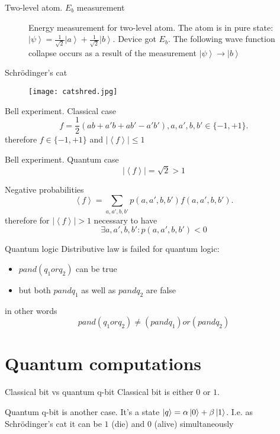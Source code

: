 \documentclass[10pt,pdf,hyperref={unicode}]{beamer}
\begin{document}
\begin{frame}{Two-level atom. $E_b$ measurement}
\begin{figure}
\centering



\caption{Energy measurement for two-level atom. The atom is in pure
  state: $\left|\psi\right> = 
\frac{1}{\sqrt{2}}\left|a\right> + \frac{1}{\sqrt{2}}\left|b\right>$.
Device got $E_b$. The following wave function collapse occurs as a
  result of the measurement $\left|\psi\right> \to \left|b\right>$
}
\label{fig:add:mesure_ex_b}
\end{figure}
\end{frame}

\begin{frame}{Schrödinger's cat}
 \begin{figure} 
   \texttt{[image: catshred.jpg]}
  \end{figure}
\end{frame}

\begin{frame}{Bell experiment. Classical case}
\[
f = \frac{1}{2}\left(
a b + a' b + a b' - a' b'
\right), a,a',b,b' \in \{-1, +1\}.
\]
therefore
\(
f \in \{-1, +1\}
\)
and
\(
\left|\left<f\right>\right| \le 1
\)
\end{frame}

\begin{frame}{Bell experiment. Quantum case}
\[
\left|\left<f\right>\right| = \sqrt{2} > 1
\]
\end{frame}


\begin{frame}{Negative probabilities}
\[
\left<f\right> = \sum_{a,a',b,b'} p(a,a',b,b') f(a,a',b,b').
\]
therefore for $\left|\left<f\right>\right| > 1$ necessary to have
\[
\exists a,a',b,b': p(a,a',b,b') < 0
\]
\end{frame}

\begin{frame}{Quantum logic}
  Distributive law is failed for quantum logic:
  \begin{itemize}
  \item $p and (q_1 or q_2)$ can be true
  \item but both $p and q_1$ as well as $p and q_2$ are false
  \end{itemize}
  in other words
  \[
  p and (q_1 or q_2) \ne (p and q_1) or (p and q_2)
  \]
\end{frame}


\section{Quantum computations}
\begin{frame}{Classical bit vs quantum q-bit}
  Classical bit is either $0$ or $1$.

  Quantum q-bit is another case. It's a state
  $\ket{q} = \alpha \ket{0} + \beta \ket{1}$. I.e. as Schrödinger's
  cat it can be $1$ (die) and $0$ (alive) simultaneously
\end{frame}
\end{document}
